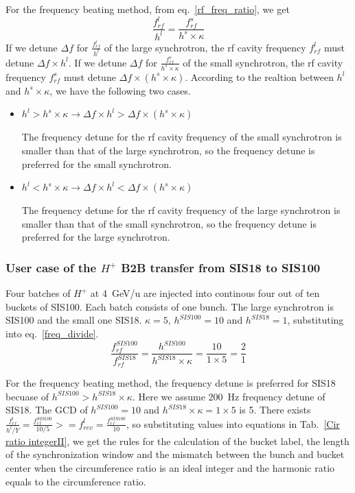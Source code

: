 For the frequency beating method, from eq.~\ref{rf_freq_ratio}, we get
\begin{equation}
\frac{f_{rf}^{l}}{h^l}= \frac{f_{rf}^{s}}{h^s \times \kappa} 
\end{equation}
If we detune $\Delta f$ for $\frac{f_{rf}^{l}}{h^l}$ of the large synchrotron, the rf cavity frequency $ f_{rf}^{l}$ must detune $\Delta f \times h^l$. If we detune $\Delta f$ for $\frac{f_{rf}^{s}}{h^s \times \kappa}$ of the small synchrotron, the rf cavity frequency $ f_{rf}^{s}$ must detune $\Delta f \times (h^s \times \kappa)$. According to the realtion between $h^l$ and $h^s \times \kappa$, we have the following two cases.
\begin{itemize}
	\item $h^l > h^s \times \kappa \rightarrow \Delta f \times h^l > \Delta f \times (h^s \times \kappa)$ 

The frequency detune for the rf cavity frequency of the small synchrotron is smaller than that of the large synchrotron, so the frequency detune is preferred for the small synchrotron.
	\item $h^l < h^s \times \kappa \rightarrow \Delta f \times h^l < \Delta f \times (h^s \times \kappa)$

The frequency detune for the rf cavity frequency of the large synchrotron is smaller than that of the small synchrotron, so the frequency detune is preferred for the large synchrotron.
\end{itemize}

\subsubsection{User case of the $H^{+}$ B2B transfer from SIS18 to SIS100}
Four batches of $H^{+}$ at \SI{4}{GeV/\atomicmassunit} are injected into continous four out of ten buckets of SIS100. Each batch consists of one bunch. The large synchrotron is SIS100 and the small one SIS18. $\kappa=5$, $h^{SIS100}=10$ and $h^{SIS18}=1$, substituting into eq.~\ref{freq_divide}.
\begin{equation}
\frac{f_{rf}^{SIS100}}{f_{rf}^{SIS18}}= \frac {h^{SIS100}}{h^{SIS18} \times \kappa}= \frac{10}{1 \times 5}=\frac{2}{1}
\end{equation}

For the frequency beating method, the frequency detune is preferred for SIS18 becuase of $h^{SIS100} > h^{SIS18} \times \kappa$. Here we assume \SI{200}{Hz} frequency detune of SIS18. The GCD of $h^{SIS100}=10$ and $h^{SIS18} \times \kappa=1\times 5$  is 5.
There exists $\frac{f_{rf}^{l}}{h^l/Y}=\frac{f_{rf}^{SIS100}}{10/5}>=f_{rev}^{l}=\frac{f_{rf}^{SIS100}}{10}$, so substituting values into equations in Tab.~\ref{Cir ratio integerII}, we get the rules for the calculation of the bucket label, the length of the synchronization window and the mismatch between the bunch and bucket center when the circumference ratio is an ideal integer and the harmonic ratio equals to the circumference ratio.

